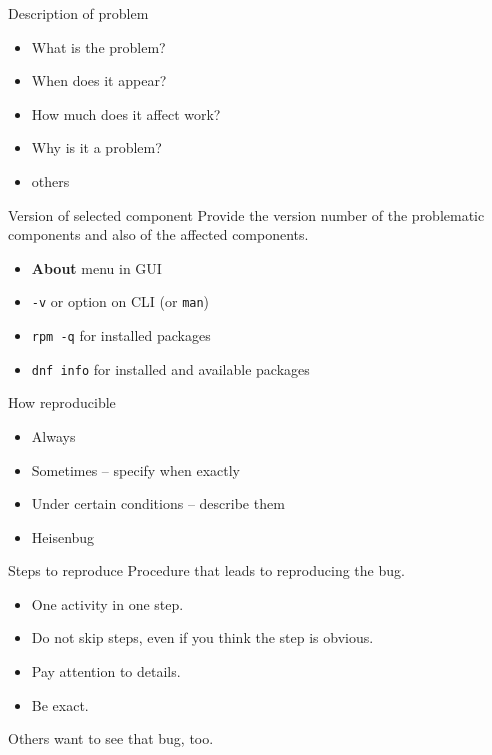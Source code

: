 \documentclass[12pt]{beamer}
\begin{document}
\begin{frame}{Description of problem}
\begin{itemize}
	\item What is the problem?
	\item When does it appear?
	\item How much does it affect work?
	\item Why is it a problem?
	\item others
\end{itemize}
\end{frame}

\begin{frame}[fragile]{Version of selected component}
Provide the version number of the problematic components and also of the affected components.
\begin{itemize}
	\item {\color{blue}\textbf{About}} menu in GUI
	\item {\color{blue}\texttt{-v}} or {\color{blue}{\verb|--version|}} option on CLI (or \texttt{man})
	\item {\color{blue}\texttt{rpm -q}} for installed packages
	\item {\color{blue}\texttt{dnf info}} for installed and available packages
\end{itemize}
\end{frame}

\begin{frame}{How reproducible}
\begin{itemize}
	\item Always
	\item Sometimes -- specify when exactly
	\item Under certain conditions -- describe them
	\item Heisenbug 
\end{itemize}
\end{frame}

\begin{frame}{Steps to reproduce}
Procedure that leads to reproducing the bug.
\begin{itemize}
	\item One activity in one step.
	\item Do not skip steps, even if you think the step is obvious.
	\item Pay attention to details.
	\item Be exact.
\end{itemize}
Others want to see that bug, too. 
\end{frame}
\end{document}
